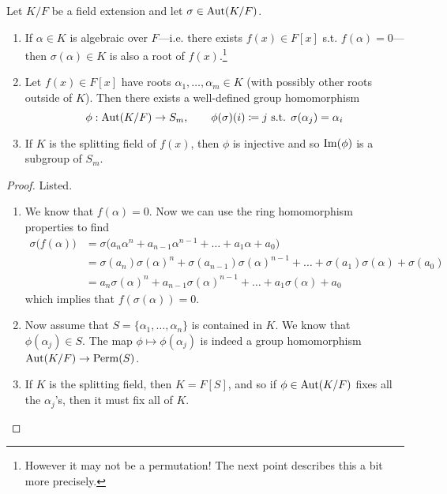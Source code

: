   \begin{lemma}
    \label{thm:f_auto_permute}
    Let $K/F$ be a field extension and let $\sigma \in \Aut(K/F)$. 
    \begin{enumerate}
      \item If $\alpha \in K$ is algebraic over $F$---i.e. there exists $f(x) \in F[x]$ s.t. $f(\alpha) = 0$---then $\sigma (\alpha) \in K$ is also a root of $f(x)$.\footnote{However it may not be a permutation! The next point describes this a bit more precisely.}

      \item Let $f(x) \in F[x]$ have roots $\alpha_1, \ldots, \alpha_m \in K$ (with possibly other roots outside of $K$). Then there exists a well-defined group homomorphism 
      \begin{equation}
        \phi: \Aut(K/F) \to S_m, \qquad \phi(\sigma)(i) \coloneqq j \text{ s.t. } \sigma(\alpha_j) = \alpha_i
      \end{equation}

      \item If $K$ is the splitting field of $f(x)$, then $\phi$ is injective and so $\im(\phi)$ is a subgroup of $S_m$. 
    \end{enumerate}
  \end{lemma}
  \begin{proof}
    Listed. 
    \begin{enumerate}
      \item We know that $f(\alpha) = 0$. Now we can use the ring homomorphism properties to find
      \begin{align}
        \sigma\big( f(\alpha) \big) & = \sigma \big( a_n \alpha^n + a_{n-1} \alpha^{n-1} + \ldots + a_1 \alpha + a_0 \big) \\  
                                    & = \sigma(a_n) \sigma(\alpha)^n + \sigma(a_{n-1}) \sigma(\alpha)^{n-1} + \ldots + \sigma(a_1) \sigma(\alpha) + \sigma(a_0) \\ 
                                    & = a_n \sigma(\alpha)^n + a_{n-1} \sigma(\alpha)^{n-1} + \ldots + a_1 \sigma(\alpha) + a_0
      \end{align}
      which implies that $f(\sigma(\alpha)) = 0$. 

      \item Now assume that $S = \{\alpha_1, \ldots, \alpha_n\}$ is contained in $K$. We know that $\phi(\alpha_j) \in S$. The map $\phi \mapsto \phi(\alpha_j)$ is indeed a group homomorphism $\Aut(K/F) \to \mathrm{Perm}(S)$. 

      \item If $K$ is the splitting field, then $K = F[S]$, and so if $\phi \in \Aut(K/F)$ fixes all the $\alpha_j$'s, then it must fix all of $K$. 
    \end{enumerate}
  \end{proof} 


